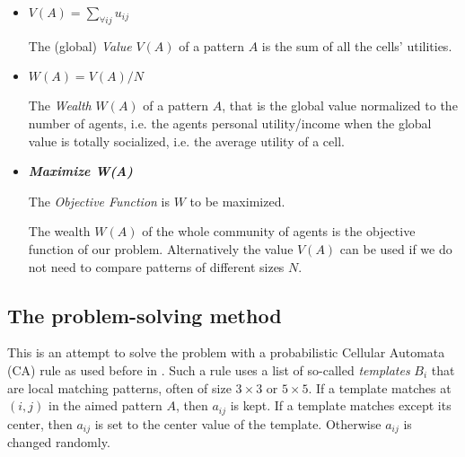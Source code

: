 \documentclass[10pt,a4paper]{article}  %
\begin{document}
\begin{itemize}
   \item
      $V(A)= \sum_{\forall ij} u_{ij}$   
      
      The (global) \textit{Value} $V(A)$ of a pattern $A$ is the sum of all the cells' utilities.

   \item  
    $W(A)=V(A)/N$   %
  
    The \textit{Wealth} $W(A)$ of a pattern $A$, that is the global value normalized to the
    number of agents, i.e. the agents personal utility/income when the global value is totally socialized,
    i.e. the average utility of a cell.  

   \item   
      
    \textbf{\textit{Maximize  W(A)}}
    
    The \textit{Objective Function} is $W$ to be maximized.    

    The wealth $W(A)$ of the whole community of agents is the objective function of our problem. %
    Alternatively the value $V(A)$ can be used if we do not need to compare patterns of different sizes $N$. 

\end{itemize}


\subsection{The problem-solving method}

This is an attempt to solve the problem with a probabilistic Cellular Automata (CA) rule as used before in
\cite{
2019-pact-domino,
2020-HoffmannSeredynski-SensorPoint,
Hoffmann-2021,
Hoffmann-2021-MinimalDominoPact,
Hoffmann-2022-PointPattern,
Hoffmann-2002-LoopPattern}.
%
Such a rule uses a list of so-called \textit{templates} $B_i$ that are local matching patterns,
often of size $3\times 3$ or $5 \times 5$.
If a template matches at $(i,j)$ in the aimed pattern $A$, then $a_{ij}$ is kept.
If a template matches except its center, then $a_{ij}$ is set to the center value of the template.
Otherwise $a_{ij}$ is changed randomly. 
\end{document}
